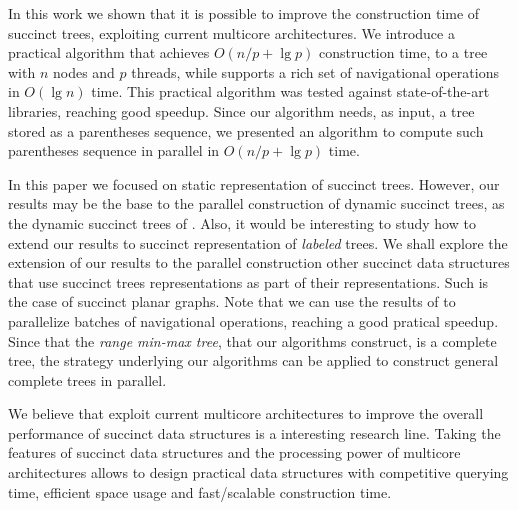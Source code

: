 In this work we shown that it is possible to improve the construction time of succinct
trees, exploiting current multicore architectures. We introduce a practical algorithm that
achieves $O(n/p+\lg p)$ construction time, to a tree with $n$ nodes and $p$
threads, while supports a rich set of navigational operations in $O(\lg n)$ time. This
practical algorithm was tested against state-of-the-art libraries, reaching good speedup.
Since our algorithm needs, as input, a tree stored as a parentheses
sequence, we presented an algorithm to compute such parentheses sequence in parallel in
$O(n/p+\lg p)$ time.

In this paper we focused on static representation of succinct trees. However, our results
may be the base to the parallel construction of dynamic succinct trees, as the dynamic
succinct trees of \cite{Navarro:2014:FFS:2620785.2601073}. Also, it would be interesting
to study how to extend our results to succinct representation of \emph{labeled} trees. We
shall explore the extension of our results to the parallel construction other succinct
data structures that use succinct trees representations as part of their representations.
Such is the case of succinct planar graphs. Note that we can use the results of
\cite{Fuentes2014} to parallelize batches of navigational operations, reaching a good
pratical speedup. Since that the \emph{range min-max tree}, that our algorithms construct,
is a complete tree, the strategy underlying our algorithms can be applied to construct
general complete trees in parallel.

We believe that exploit current multicore architectures to improve the overall performance
of succinct data structures is a interesting research line. Taking the features of
succinct data structures and the processing power of multicore architectures allows to
design practical data structures with competitive querying time, efficient space usage and
fast/scalable construction time.